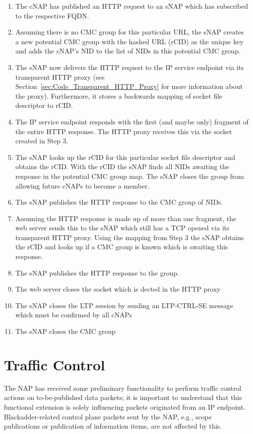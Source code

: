 \documentclass[a4paper,11pt,titlepage]{report}
\begin{document}
\begin{enumerate}
	\item The \ac{cNAP} has published an HTTP request to an \ac{sNAP} which has subscribed to the respective \ac{FQDN}.
	\item Assuming there is no \ac{CMC} group for this particular \ac{URL}, the \ac{sNAP} creates a new potential \ac{CMC} group with the hashed \ac{URL} (\ac{rCID}) as the unique key and adds the \ac{cNAP}'s \ac{NID} to the list of \acp{NID} in this potential \ac{CMC} group.
	\item The \ac{sNAP} now delivers the HTTP request to the IP service endpoint via its transparent HTTP proxy (see Section~\ref{sec:Code_Transparent_HTTP_Proxy} for more information about the proxy). Furthermore, it stores a backwards mapping of socket file descriptor to \ac{rCID}.
	\item The IP service endpoint responds with the first (and maybe only) fragment of the entire HTTP response. The HTTP proxy receives this via the socket created in Step 3. 
	\item The \ac{sNAP} looks up the \ac{rCID} for this particular socket file descriptor and obtains the \ac{rCID}. With the \ac{rCID} the \ac{sNAP} finds all \acp{NID} awaiting the response in the potential \ac{CMC} group map. The \ac{sNAP} closes the group from allowing future \acp{cNAP} to become a member.
	\item The \ac{sNAP} publishes the HTTP response to the \ac{CMC} group of \acp{NID}.
	\item Assuming the HTTP response is made up of more than one fragment, the web server sends this to the \ac{sNAP} which still has a TCP opened via its transparent HTTP proxy. Using the mapping from Step 3 the \ac{sNAP} obtains the \ac{rCID} and looks up if a \ac{CMC} group is known which is awaiting this response.
	\item The \ac{sNAP} publishes the HTTP response to the group.
	\item The web server closes the socket which is dected in the HTTP proxy
	\item The \ac{sNAP} closes the \ac{LTP} session by sending an \ac{LTP}-CTRL-\ac{SE} message which must be confirmed by all \ac{cNAPs}
	\item The \ac{sNAP} closes the \ac{CMC} group
\end{enumerate}
\section{Traffic Control}
The \ac{NAP} has received some preliminary functionality to perform traffic control actions on to-be-published data packets; it is important to understand that this functional extension is solely influencing packets originated from an IP endpoint. Blackadder-related control plane packets sent by the NAP, e.g., scope publications or publication of information items, are not affected by this.
\end{document}
